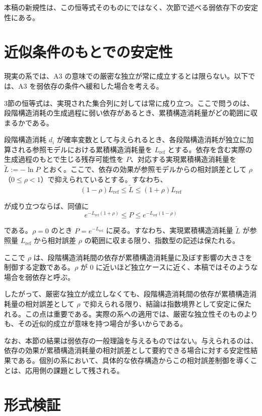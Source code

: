 \documentclass[12pt,a4paper]{article}
\begin{document}
本稿の新規性は、この恒等式そのものにではなく、次節で述べる弱依存下の安定性にある。

\section{近似条件のもとでの安定性}\label{ux8fd1ux4f3cux6761ux4ef6ux306eux3082ux3068ux3067ux306eux5b89ux5b9aux6027}

現実の系では、A3 の意味での厳密な独立が常に成立するとは限らない。以下では、A3 を弱依存の条件へ緩和した場合を考える。

3節の恒等式は、実現された集合列に対しては常に成り立つ。ここで問うのは、段階構造消耗の生成過程に弱い依存があるとき、累積構造消耗量がどの範囲に収まるかである。

段階構造消耗 \(d_i\) が確率変数として与えられるとき、各段階構造消耗が独立に加算される参照モデルにおける累積構造消耗量を \(L_{\text{ref}}\) とする。依存を含む実際の生成過程のもとで生じる残存可能性を \(P\)、対応する実現累積構造消耗量を \(\tilde{L} := -\ln P\) とおく。ここで、依存の効果が参照モデルからの相対誤差として \(\rho\)（\(0 \le \rho < 1\)）で抑えられているとする。すなわち、 \[
(1-\rho)L_{\text{ref}} \le \tilde{L} \le (1+\rho)L_{\text{ref}}
\]

が成り立つならば、同値に \[
e^{-L_{\text{ref}}(1+\rho)} \le P \le e^{-L_{\text{ref}}(1-\rho)}
\]

である。\(\rho = 0\) のとき \(P = e^{-L_{\text{ref}}}\) に戻る。すなわち、実現累積構造消耗量 \(\tilde{L}\) が参照量 \(L_{\text{ref}}\) から相対誤差 \(\rho\) の範囲に収まる限り、指数型の記述は保たれる。

ここで \(\rho\) は、段階構造消耗間の依存が累積構造消耗量に及ぼす影響の大きさを制御する定数である。\(\rho\) が 0 に近いほど独立ケースに近く、本稿ではそのような場合を弱依存と呼ぶ。

したがって、厳密な独立が成立しなくても、段階構造消耗間の依存が累積構造消耗量の相対誤差として \(\rho\) で抑えられる限り、結論は指数境界として安定に保たれる。この点は重要である。実際の系への適用では、厳密な独立性そのものよりも、その近似的成立が意味を持つ場合が多いからである。

なお、本節の結果は弱依存の一般理論を与えるものではない。与えられるのは、依存の効果が累積構造消耗量の相対誤差として要約できる場合に対する安定性結果である。個別の系において、具体的な依存構造からこの相対誤差制御を導くことは、応用側の課題として残される。

\section{形式検証}\label{ux5f62ux5f0fux691cux8a3c}
\end{document}
